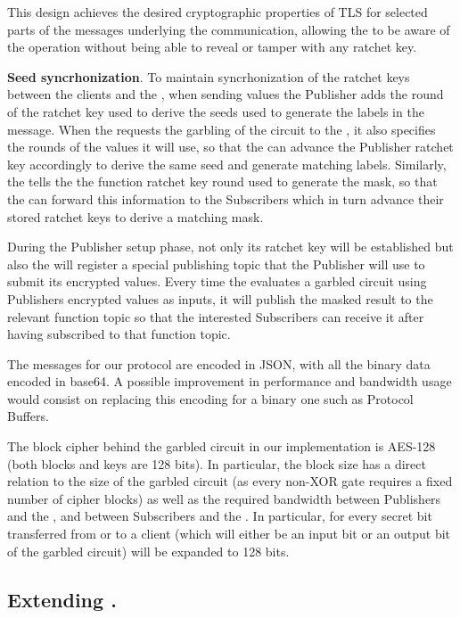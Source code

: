This design achieves the desired cryptographic properties of TLS for selected
parts of the messages underlying the \MQTT{} communication, allowing the \broker
to be aware of the operation without being able to reveal or tamper with any
ratchet key.

\noindent\textbf{Seed syncrhonization}. To maintain syncrhonization of the
ratchet keys between the clients and the \garbler, when sending values the
Publisher adds the round of the ratchet key used to derive the seeds used to
generate the labels in the message.  When the \broker requests the garbling of
the circuit to the \garbler, it also specifies the rounds of the values it will
use, so that the \garbler can advance the Publisher ratchet key accordingly to
derive the same seed and generate matching labels.  Similarly, the \garbler
tells the \broker the function ratchet key round used to generate the mask, so
that the \broker can forward this information to the Subscribers which in turn
advance their stored ratchet keys to derive a matching mask.

During the Publisher setup phase, not only its ratchet key will be established
but also the \broker will register a special publishing topic that the Publisher
will use to submit its encrypted values.  Every time the \broker evaluates a
garbled circuit using Publishers encrypted values as inputs, it will publish
the masked result to the relevant function topic so that the interested
Subscribers can receive it after having subscribed to that function topic.

The \MQTT{} messages for our protocol are encoded in JSON, with all the binary
data encoded in base64.  A possible improvement in performance and bandwidth
usage would consist on replacing this encoding for a binary one such as
Protocol Buffers.

The block cipher behind the garbled circuit in our implementation is AES-128
(both blocks and keys are 128 bits).  In particular, the block size has a
direct relation to the size of the garbled circuit (as every non-XOR gate
requires a fixed number of cipher blocks) as well as the required bandwidth
between Publishers and the \broker, and between Subscribers and the \broker.  In
particular, for every secret bit transferred from or to a client (which will
either be an input bit or an output bit of the garbled circuit) will be
expanded to 128 bits.

\subsection{Extending \libgarble.}

